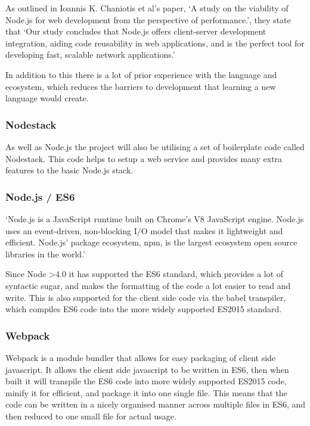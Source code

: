 As outlined in Ioannis K. Chaniotis et al's paper, `A study on the viability of Node.js for web development from the perspective of performance.', they state that `Our study concludes that Node.js offers client-server development integration, aiding code reusability in web applications, and is the perfect tool for developing fast, scalable network applications.'\cite{node-perf}

In addition to this there is a lot of prior experience with the language and ecosystem, which reduces the barriers to development that learning a new language would create. 

\subsubsection{Nodestack}
As well as Node.js the project will also be utilising a set of boilerplate code called Nodestack\cite{nodestack}. This code helps to setup a web service and provides many extra features to the basic Node.js stack. 

\subsubsection*{Node.js / ES6}

`Node.js is a JavaScript runtime built on Chrome's V8 JavaScript engine. Node.js uses an event-driven, non-blocking I/O model that makes it lightweight and efficient. Node.js' package ecosystem, npm, is the largest ecosystem open source libraries in the world.'\cite{node-org}

    Since Node \textgreater4.0 it has supported the ES6 standard, which provides a lot of syntactic sugar, and makes the formatting of the code a lot easier to read and write. This is also supported for the client side code via the babel transpiler, which compiles ES6 code into the more widely supported ES2015 standard.

    \subsubsection*{Webpack}
    
    Webpack is a module bundler that allows for easy packaging of client side javascript. It allows the client side javascript to be written in ES6, then when built it will transpile the ES6 code into more widely supported ES2015 code, minify it for efficient, and package it into one single file. This means that the code can be written in a nicely organised manner across multiple files in ES6, and then reduced to one small file for actual usage. 

